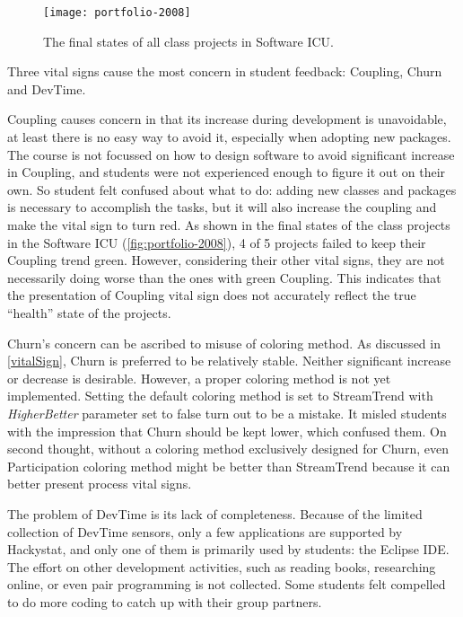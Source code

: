 \begin{figure}[htbp] %
   \centering
   \texttt{[image: portfolio-2008]} 
   \caption{The final states of all class projects in Software ICU.}
   \label{fig:portfolio-2008}
\end{figure}

Three vital signs cause the most concern in student feedback: Coupling, Churn and DevTime.

Coupling causes concern in that its increase during development is unavoidable, at least there is no easy way to avoid it, especially when adopting new packages. The course is not focussed on how to design software to avoid significant increase in Coupling, and students were not experienced enough to figure it out on their own. So student felt confused about what to do: adding new classes and packages is necessary to accomplish the tasks, but it will also increase the coupling and make the vital sign to turn red. As shown in the final states of the class projects in the Software ICU (\autoref{fig:portfolio-2008}), 4 of 5 projects failed to keep their Coupling trend green. However, considering their other vital signs, they are not necessarily doing worse than the ones with green Coupling. This indicates that the presentation of Coupling vital sign does not accurately reflect the true ``health'' state of the projects.  

Churn's concern can be ascribed to misuse of coloring method. As discussed in \autoref{vitalSign}, Churn is preferred to be relatively stable. Neither significant increase or decrease is desirable. However, a proper coloring method is not yet implemented. Setting the default coloring method is set to StreamTrend with {\it HigherBetter} parameter set to false turn out to be a mistake. It misled students with the impression that Churn should be kept lower, which confused them. On second thought, without a coloring method exclusively designed for Churn, even Participation coloring method might be better than StreamTrend because it can better present process vital signs.

The problem of DevTime is its lack of completeness. Because of the limited collection of DevTime sensors, only a few applications are supported by Hackystat, and only one of them is primarily used by students: the Eclipse IDE. The effort on other development activities, such as reading books, researching online, or even pair programming is not collected. Some students felt compelled to do more coding to catch up with their group partners.


